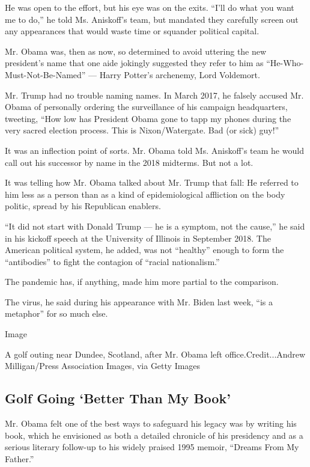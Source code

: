 He was open to the effort, but his eye was on the exits. ``I'll do what
you want me to do,'' he told Ms. Aniskoff's team, but mandated they
carefully screen out any appearances that would waste time or squander
political capital.

Mr. Obama was, then as now, so determined to avoid uttering the new
president's name that one aide jokingly suggested they refer to him as
``He-Who-Must-Not-Be-Named'' --- Harry Potter's archenemy, Lord
Voldemort.

Mr. Trump had no trouble naming names. In March 2017, he falsely accused
Mr. Obama of personally ordering the surveillance of his campaign
headquarters, tweeting, ``How low has President Obama gone to tapp my
phones during the very sacred election process. This is Nixon/Watergate.
Bad (or sick) guy!''

It was an inflection point of sorts. Mr. Obama told Ms. Aniskoff's team
he would call out his successor by name in the 2018 midterms. But not a
lot.

It was telling how Mr. Obama talked about Mr. Trump that fall: He
referred to him less as a person than as a kind of epidemiological
affliction on the body politic, spread by his Republican enablers.

``It did not start with Donald Trump --- he is a symptom, not the
cause,'' he said in his kickoff speech at the University of Illinois in
September 2018. The American political system, he added, was not
``healthy'' enough to form the ``antibodies'' to fight the contagion of
``racial nationalism.''

The pandemic has, if anything, made him more partial to the comparison.

The virus, he said during his appearance with Mr. Biden last week, ``is
a metaphor'' for so much else.

Image

A golf outing near Dundee, Scotland, after Mr. Obama left
office.Credit...Andrew Milligan/Press Association Images, via Getty
Images

\hypertarget{golf-going-better-than-my-book}{%
\subsection{Golf Going `Better Than My
Book'}\label{golf-going-better-than-my-book}}

Mr. Obama felt one of the best ways to safeguard his legacy was by
writing his book, which he envisioned as both a detailed chronicle of
his presidency and as a serious literary follow-up to his widely praised
1995 memoir, ``Dreams From My Father.''

